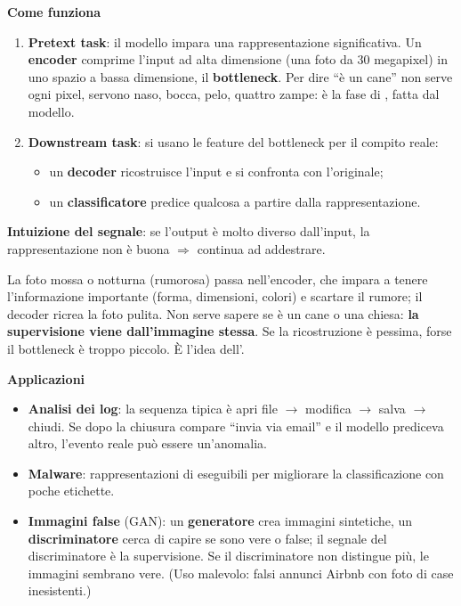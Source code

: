 \textbf{Come funziona}
\begin{enumerate}
  \item \textbf{Pretext task}: il modello impara una rappresentazione significativa. Un \textbf{encoder} comprime
        l'input ad alta dimensione (una foto da 30 megapixel) in uno spazio a bassa dimensione, il
        \textbf{bottleneck}. Per dire ``è un cane'' non serve ogni pixel, servono naso, bocca, pelo, quattro zampe:
        è la fase di , fatta dal modello.
  \item \textbf{Downstream task}: si usano le feature del bottleneck per il compito reale:
        \begin{itemize}
          \item un \textbf{decoder} ricostruisce l'input e si confronta con l'originale;
          \item un \textbf{classificatore} predice qualcosa a partire dalla rappresentazione.
        \end{itemize}
\end{enumerate}
\textbf{Intuizione del segnale}: se l'output è molto diverso dall'input, la rappresentazione non è buona
$\Rightarrow$ continua ad addestrare.

\begin{esempio}
La foto mossa o notturna (rumorosa) passa nell'encoder, che impara a tenere l'informazione importante (forma,
dimensioni, colori) e scartare il rumore; il decoder ricrea la foto pulita. Non serve sapere se è un cane o una chiesa:
\textbf{la supervisione viene dall'immagine stessa}. Se la ricostruzione è pessima, forse il bottleneck è troppo piccolo.
È l'idea dell'.
\end{esempio}

\textbf{Applicazioni}
\begin{itemize}
  \item \textbf{Analisi dei log}: la sequenza tipica è apri file $\to$ modifica $\to$ salva $\to$ chiudi. Se dopo la chiusura
        compare ``invia via email'' e il modello prediceva altro, l'evento reale può essere un'anomalia.
  \item \textbf{Malware}: rappresentazioni di eseguibili per migliorare la classificazione con poche etichette.
  \item \textbf{Immagini false} (GAN): un \textbf{generatore} crea immagini sintetiche, un \textbf{discriminatore} cerca di
        capire se sono vere o false; il segnale del discriminatore è la supervisione. Se il discriminatore non distingue più,
        le immagini sembrano vere. (Uso malevolo: falsi annunci Airbnb con foto di case inesistenti.)
\end{itemize}

